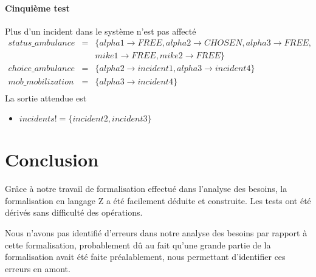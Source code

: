 \documentclass{report}
\begin{document}
\subsubsection{Cinquième test}
Plus d'un incident dans le système n'est pas affecté
\begin{eqnarray*}
status\_ambulance &=& \{alpha1 \rightarrow FREE, alpha2 \rightarrow CHOSEN, alpha3 \rightarrow FREE, \\ 
	&& mike1 \rightarrow FREE, mike2 \rightarrow FREE\} \\
choice\_ambulance &=& \{alpha2 \rightarrow incident1, alpha3 \rightarrow incident4\} \\
mob\_mobilization &=& \{alpha3 \rightarrow incident4\} \\
\end{eqnarray*}
La sortie attendue est 
\begin{itemize}
	\item $incidents! = \{incident2, incident3\}$
\end{itemize}

\chapter*{Conclusion}

Grâce à notre travail de formalisation effectué dans l'analyse des besoins, 
la formalisation en langage Z a été facilement déduite et construite. Les tests
ont été dérivés sans difficulté des opérations. 

Nous n'avons pas identifié d'erreurs dans notre analyse des besoins par
rapport à cette formalisation, probablement dû au fait qu'une grande partie
de la formalisation avait été faite préalablement, nous permettant d'identifier
ces erreurs en amont.
\end{document}

